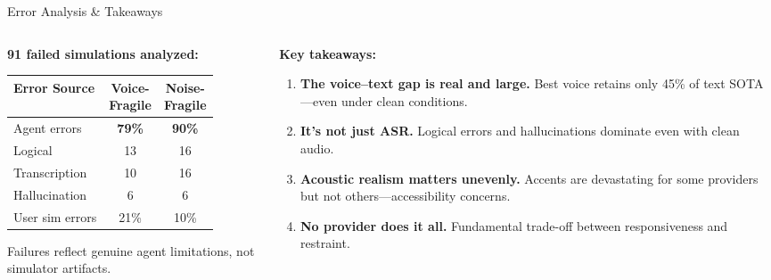 \documentclass[aspectratio=169]{beamer}
\begin{document}
\begin{frame}{Error Analysis \& Takeaways}

  \begin{columns}[T]
    \begin{column}{0.45\textwidth}
      \textbf{91 failed simulations analyzed:}

      \vspace{0.3em}
      \begin{small}
      \begin{tabular}{@{}lcc@{}}
        \toprule
        \textbf{Error Source} & \makecell{\textbf{Voice-}\\\textbf{Fragile}} & \makecell{\textbf{Noise-}\\\textbf{Fragile}} \\
        \midrule
        Agent errors & \textbf{79\%} & \textbf{90\%} \\
        \quad Logical & 13 & 16 \\
        \quad Transcription & 10 & 16 \\
        \quad Hallucination & 6 & 6 \\
        \midrule
        User sim errors & 21\% & 10\% \\
        \bottomrule
      \end{tabular}
      \end{small}

      \vspace{0.3em}
      {\small Failures reflect genuine agent limitations, not simulator artifacts.}
    \end{column}
    \begin{column}{0.53\textwidth}
      \textbf{Key takeaways:}

      \vspace{0.2em}
      \begin{enumerate}
        \item \textbf{The voice--text gap is real and large.} Best voice retains only 45\% of text SOTA---even under clean conditions.

        \item \textbf{It's not just ASR.} Logical errors and hallucinations dominate even with clean audio.

        \item \textbf{Acoustic realism matters unevenly.} Accents are devastating for some providers but not others---accessibility concerns.

        \item \textbf{No provider does it all.} Fundamental trade-off between responsiveness and restraint.
      \end{enumerate}
    \end{column}
  \end{columns}

\end{frame}
\end{document}
